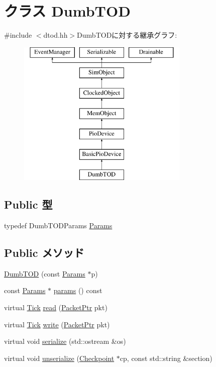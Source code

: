 \hypertarget{classDumbTOD}{
\section{クラス DumbTOD}
\label{classDumbTOD}
}


{\ttfamily \#include $<$dtod.hh$>$}DumbTODに対する継承グラフ:\begin{figure}[H]
\begin{center}
\leavevmode
\includegraphics[height=7cm]{classDumbTOD}
\end{center}
\end{figure}
\subsection*{Public 型}
\begin{DoxyCompactItemize}
\item 
typedef DumbTODParams \hyperlink{classDumbTOD_ac75d9dee405db8ba88e1f9823b893008}{Params}
\end{DoxyCompactItemize}
\subsection*{Public メソッド}
\begin{DoxyCompactItemize}
\item 
\hyperlink{classDumbTOD_a67e4f4f0072b0ebbe55ff909d378e11b}{DumbTOD} (const \hyperlink{classDumbTOD_ac75d9dee405db8ba88e1f9823b893008}{Params} $\ast$p)
\item 
const \hyperlink{classDumbTOD_ac75d9dee405db8ba88e1f9823b893008}{Params} $\ast$ \hyperlink{classDumbTOD_acd3c3feb78ae7a8f88fe0f110a718dff}{params} () const 
\item 
virtual \hyperlink{base_2types_8hh_a5c8ed81b7d238c9083e1037ba6d61643}{Tick} \hyperlink{classDumbTOD_a613ec7d5e1ec64f8d21fec78ae8e568e}{read} (\hyperlink{classPacket}{PacketPtr} pkt)
\item 
virtual \hyperlink{base_2types_8hh_a5c8ed81b7d238c9083e1037ba6d61643}{Tick} \hyperlink{classDumbTOD_a4cefab464e72b5dd42c003a0a4341802}{write} (\hyperlink{classPacket}{PacketPtr} pkt)
\item 
virtual void \hyperlink{classDumbTOD_a53e036786d17361be4c7320d39c99b84}{serialize} (std::ostream \&os)
\item 
virtual void \hyperlink{classDumbTOD_af22e5d6d660b97db37003ac61ac4ee49}{unserialize} (\hyperlink{classCheckpoint}{Checkpoint} $\ast$cp, const std::string \&section)
\end{DoxyCompactItemize}
